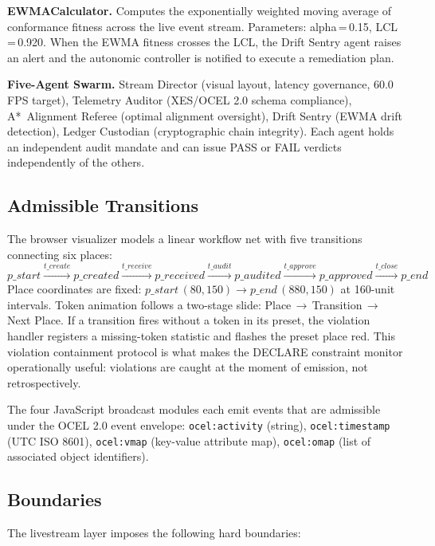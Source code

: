 \textbf{EWMACalculator.} Computes the exponentially weighted moving average of
conformance fitness across the live event stream. Parameters: alpha\,=\,0.15,
LCL\,=\,0.920. When the EWMA fitness crosses the LCL, the Drift Sentry agent raises
an alert and the autonomic controller is notified to execute a remediation plan.

\textbf{Five-Agent Swarm.} Stream Director (visual layout, latency governance,
60.0\,FPS target), Telemetry Auditor (XES/OCEL 2.0 schema compliance), A*~Alignment
Referee (optimal alignment oversight), Drift Sentry (EWMA drift detection),
Ledger Custodian (cryptographic chain integrity). Each agent holds an independent
audit mandate and can issue PASS or FAIL verdicts independently of the others.

\subsection{Admissible Transitions}
\label{sec:livestream-arch-transitions}

The browser visualizer models a linear workflow net with five transitions connecting
six places:
\[
  p\_start \xrightarrow{t\_create} p\_created
           \xrightarrow{t\_receive} p\_received
           \xrightarrow{t\_audit} p\_audited
           \xrightarrow{t\_approve} p\_approved
           \xrightarrow{t\_close} p\_end
\]
Place coordinates are fixed: $p\_start\,(80,150) \to p\_end\,(880,150)$ at 160-unit
intervals. Token animation follows a two-stage slide: Place\,$\to$\,Transition\,$\to$\,
Next Place. If a transition fires without a token in its preset, the violation handler
registers a missing-token statistic and flashes the preset place red. This violation
containment protocol is what makes the DECLARE constraint monitor operationally useful:
violations are caught at the moment of emission, not retrospectively.

The four JavaScript broadcast modules each emit events that are admissible under the
OCEL 2.0 event envelope: \texttt{ocel:activity} (string), \texttt{ocel:timestamp}
(UTC ISO 8601), \texttt{ocel:vmap} (key-value attribute map),
\texttt{ocel:omap} (list of associated object identifiers).

\subsection{Boundaries}
\label{sec:livestream-arch-boundaries}

The livestream layer imposes the following hard boundaries:

